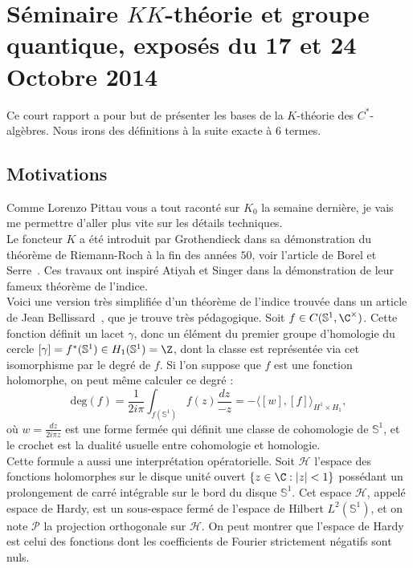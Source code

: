 \section{Séminaire $KK$-théorie et groupe quantique, exposés du 17 et 24 Octobre 2014}

Ce court rapport a pour but de présenter les bases de la $K$-théorie des $C^*$-algèbres. Nous irons des définitions à la suite exacte à $6$ termes. 

\subsection{Motivations}

Comme Lorenzo Pittau vous a tout raconté sur $K_0$ la semaine dernière, je vais me permettre d'aller plus vite sur les détails techniques. \\

Le foncteur $K$ a été introduit par Grothendieck dans sa démonstration du théorème de Riemann-Roch à la fin des années $50$, voir l'article de Borel et Serre~\cite{BorelSerre}. Ces travaux ont inspiré Atiyah et Singer dans la démonstration de leur fameux théorème de l'indice. \\

Voici une version très simplifiée d'un théorème de l'indice trouvée dans un article de Jean Bellissard~\cite{Bellissard}, que je trouve très pédagogique. Soit $f\in C(\mathbb S^1,\C^\times)$. Cette fonction définit un lacet $\gamma$, donc un élément du premier groupe d'homologie du cercle $[\gamma]=f^*(\mathbb S^1)\in H_1(\mathbb S^1)=\Z$, dont la classe est représentée via cet isomorphisme par le degré de $f$. Si l'on suppose que $f$ est une fonction holomorphe, on peut même calculer ce degré : 
\[\text{deg}(f)=\frac{1}{2i\pi}\int_{f(\mathbb S^1)} f(z)\frac{dz}{-z}= -\langle [w],[f]\rangle_{H^1\times H_1},\] 
où $w=\frac{dz}{2i\pi z}$ est une forme fermée qui définit une classe de cohomologie de $\mathbb S^1$, et le crochet est la dualité usuelle entre cohomologie et homologie.\\

Cette formule a aussi une interprétation opératorielle. Soit $\mathcal H$ l'espace des fonctions holomorphes sur le disque unité ouvert $\{z\in \C : |z|<1\}$ possédant un prolongement de carré intégrable sur le bord du disque $\mathbb S^1$. Cet espace $\mathcal H$, appelé espace de Hardy, est un sous-espace fermé de l'espace de Hilbert $L^2(\mathbb S^1)$, et on note $\mathcal P$ la projection orthogonale sur $\mathcal H$. On peut montrer que l'espace de Hardy est celui des fonctions dont les coefficients de Fourier strictement négatifs sont nuls.\\

